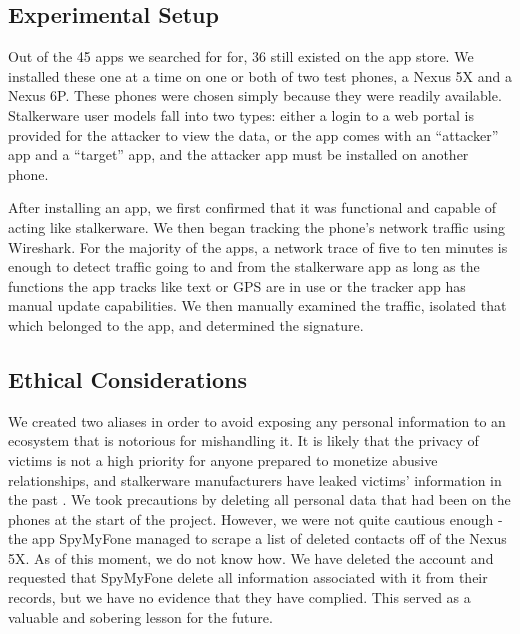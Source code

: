 \documentclass[acmtog]{acmart}
\begin{document}
\subsection{Experimental Setup}
Out of the 45 apps we searched for for, 36 still existed on the app store. We 
installed these one at a 
time on one or both of two test phones, a Nexus 5X and a Nexus 6P. These phones 
were chosen simply because they were readily available. Stalkerware user 
models  fall into two types: either 
a login to a web portal is provided for the attacker to view the data, or 
the app comes with an ``attacker'' app and a ``target'' app, and the attacker 
app must be installed on another phone.

After installing an app, we first confirmed that it was functional and capable 
of acting like stalkerware. 
We then began tracking the phone's network traffic using Wireshark. For the 
majority of the apps, a network trace 
of five to ten minutes is enough to detect traffic going to and from the 
stalkerware app as long as the functions the app tracks like text or GPS are 
in use or the tracker app has manual update capabilities. We then manually 
examined the traffic, isolated that which belonged to the app, and determined 
the signature.

\subsection{Ethical Considerations}

We created two aliases in order to avoid exposing any personal information to 
an ecosystem that is notorious for mishandling it\cite{ristenpart_ucsd_talk}. 
It is likely that the privacy of victims is 
not a high priority for anyone prepared to monetize abusive relationships, and 
stalkerware manufacturers have leaked victims' information in the past 
\cite{koebler_stalkerware_2018, franceschi-bicchierai_this_2019}. We took 
precautions by deleting all personal 
data that had been on the phones at the start of the project. However, we were 
not quite cautious enough - the app SpyMyFone managed to scrape a list of 
deleted contacts off of the Nexus 5X. As of this moment, we do not know how. We 
have deleted the account and requested that SpyMyFone delete all information 
associated with it from their records, but we have no evidence that they have 
complied. This served as a valuable and sobering lesson for the future.
\end{document}
